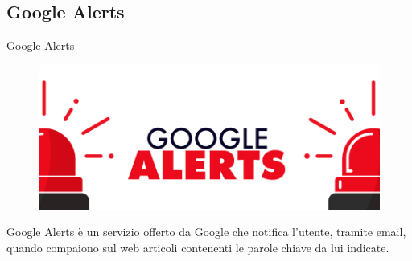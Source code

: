\documentclass{beamer}
\begin{document}
\subsection{Google Alerts}
\begin{frame}{Google Alerts}
\begin{figure}[h!]
\includegraphics[width = \linewidth]{immagini/alerts.jpg}
\end{figure}
\center Google Alerts è un servizio offerto da Google che notifica l'utente, tramite email, quando compaiono sul web articoli contenenti le parole chiave da lui indicate.
\end{frame}
\end{document}
